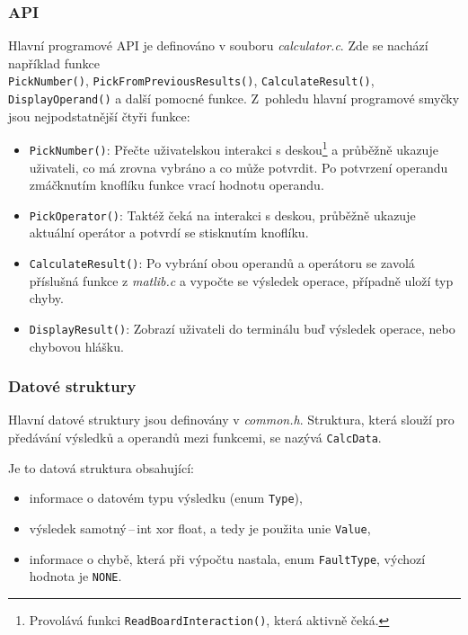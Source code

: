 \documentclass[a4paper, 11pt]{article}
\begin{document}
\subsubsection{API}\label{2_2_2:api}

Hlavní programové API je definováno v souboru \emph{calculator.c}.
Zde se nachází například funkce \\ \texttt{PickNumber()}, \texttt{PickFromPreviousResults()}, \texttt{CalculateResult()}, \texttt{DisplayOperand()} a další pomocné funkce.
Z~pohledu hlavní programové smyčky jsou nejpodstatnější čtyři funkce:
\begin{itemize}
    \item \texttt{PickNumber()}: Přečte uživatelskou interakci s deskou\footnote{Provolává funkci \texttt{ReadBoardInteraction()}, která aktivně čeká.} a průběžně ukazuje uživateli, co má zrovna vybráno a co může potvrdit. Po potvrzení operandu zmáčknutím knoflíku funkce vrací hodnotu operandu.
    \item \texttt{PickOperator()}: Taktéž čeká na interakci s deskou, průběžně ukazuje aktuální operátor a potvrdí se stisknutím knoflíku.
    \item \texttt{CalculateResult()}: Po vybrání obou operandů a operátoru se zavolá příslušná funkce z \emph{matlib.c} a vypočte se výsledek operace, případně uloží typ chyby.
    \item \texttt{DisplayResult()}: Zobrazí uživateli do terminálu buď výsledek operace, nebo chybovou hlášku.
\end{itemize}

\subsubsection{Datové struktury}\label{2_2_3:struktury}

Hlavní datové struktury jsou definovány v \emph{common.h}. 
Struktura, která slouží pro předávání výsledků a operandů mezi funkcemi, se nazývá \texttt{CalcData}.

Je to datová struktura obsahující:
\begin{itemize}
    \item informace o datovém typu výsledku (enum \texttt{Type}),
    \item výsledek samotný\,--\,int xor float, a tedy je použita unie \texttt{Value},
    \item informace o chybě, která při výpočtu nastala, enum \texttt{FaultType}, výchozí hodnota je \texttt{NONE}.
\end{itemize}
\end{document}
